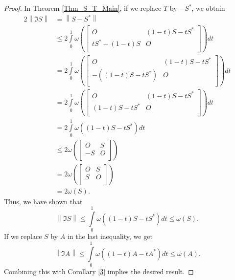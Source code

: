 \documentclass[12pt,twoside,reqno]{amsart}
\numberwithin{equation}{section}
\begin{document}
\begin{proof}
In Theorem \ref{Thm_S_T_Main}, if we replace $T$ by $-{{S}^{*}}$, we obtain
	\[\begin{aligned}
   2\left\| \Im S \right\|&=\left\| S-{{S}^{*}} \right\| \\ 
 & \le 2\int\limits_{0}^{1}{\omega \left( \left[ \begin{matrix}
   O & \left( 1-t \right)S-t{{S}^{*}}  \\
   t{{S}^{*}}-\left( 1-t \right)S & O  \\
\end{matrix} \right] \right)dt} \\ 
 & =2\int\limits_{0}^{1}{\omega \left( \left[ \begin{matrix}
   O & \left( 1-t \right)S-t{{S}^{*}}  \\
   -\left( \left( 1-t \right)S-t{{S}^{*}} \right) & O  \\
\end{matrix} \right] \right)dt} \\ 
 & =2\int\limits_{0}^{1}{\omega \left( \left[ \begin{matrix}
   O & \left( 1-t \right)S-t{{S}^{*}}  \\
   \left( 1-t \right)S-t{{S}^{*}} & O  \\
\end{matrix} \right] \right)dt} \\ 
 & =2\int\limits_{0}^{1}{\omega \left( \left( 1-t \right)S-t{{S}^{*}} \right)dt} \\ 
 & \le 2\omega \left( \left[ \begin{matrix}
   O & S  \\
   -S & O  \\
\end{matrix} \right] \right) \\ 
 & =2\omega \left( \left[ \begin{matrix}
   O & S  \\
   S & O  \\
\end{matrix} \right] \right) \\ 
 & =2\omega \left( S \right).  
\end{aligned}\]
Thus, we have shown that
\[\left\| \Im S \right\|\le \int\limits_{0}^{1}{\omega \left( \left( 1-t \right)S-t{{S}^{*}} \right)dt}\le \omega \left( S \right).\]
If we replace $S$ by $A$ in the last inequality, we get 
\[\left\| \Im A \right\|\le \int\limits_{0}^{1}{\omega \left( \left( 1-t \right)A-t{{A}^{*}} \right)dt}\le \omega \left( A \right).\]
Combining this with Corollary \ref{3} implies the desired result.
\end{proof}
\end{document}
